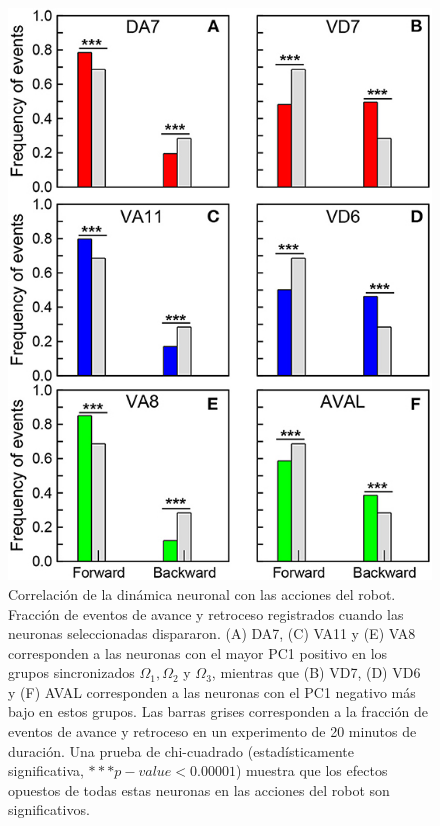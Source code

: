  \begin{figure}[h!]
	\centering\includegraphics[width=\imsize]{neuronas_comportamiento.jpg}
	\caption[ Correlación de la dinámica neuronal con las acciones del robot.]{Correlación de la dinámica neuronal con las acciones del robot. Fracción de eventos de avance y retroceso registrados cuando las neuronas seleccionadas dispararon. (A) DA7, (C) VA11 y (E) VA8 corresponden a las neuronas con el mayor PC1 positivo en los grupos sincronizados $\Omega_1, \Omega_2$ y $\Omega_3$, mientras que (B) VD7, (D) VD6 y (F) AVAL corresponden a las neuronas con el PC1 negativo más bajo en estos grupos. Las barras grises corresponden a la fracción de eventos de avance y retroceso en un experimento de 20 minutos de duración. Una prueba de chi-cuadrado (estadísticamente significativa, $***p-value < 0.00001$) muestra que los efectos opuestos de todas estas neuronas en las acciones del robot son significativos.}\label{fig:neuronas_comportamiento}
\end{figure}


